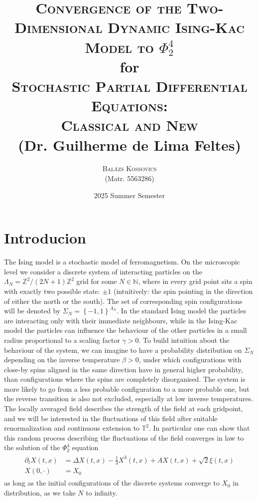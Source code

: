 \documentclass{report}
\title{\textsc{Convergence of the Two-Dimensional Dynamic Ising-Kac Model to $\Phi^4_2$}
\\[1.5em]
{\small {for}}\\[1.5em]
{\Large \textsc{Stochastic Partial Differential Equations: \\Classical and New}}\\
{\large (Dr. Guilherme de Lima Feltes)}}
\author{
    \textsc{Balázs Kossovics}\\
    {\small (Matr. 5563286)}
}
\date{2025 Summer Semester}
\newcommand{\ZZ}{\mathbb{Z}}
\newcommand{\NN}{\mathbb{N}}
\newcommand{\TT}{\mathbb{T}}
\theoremstyle{remark}
\theoremstyle{definition}
\begin{document}
\maketitle

\newpage
\setcounter{page}{2}

\tableofcontents

\chapter{Introducion}
The Ising model is a stochastic model of ferromagnetism. On the microscopic level we consider a discrete system of interacting particles on the $\Lambda_N = \ZZ^2 / (2N+1)\ZZ^2$ grid for some $N \in \NN$, where in every grid point sits a spin with exactly two possible state: $\pm1$ (intuitively: the spin pointing in the direction of either the north or the south). The set of corresponding spin configurations will be denoted by $\Sigma_N = \left\{-1, 1\right\}^{\Lambda_N}$. In the standard Ising model the particles are interacting only with their immediate neighbours, while in the Ising-Kac model the particles can influence the behaviour of the other particles in a small radius proportional to a scaling factor $\gamma > 0$. To build intuition about the behaviour of the system, we can imagine to have a probability distribution on $\Sigma_N$ depending on the inverse temperature $\beta > 0$, under which configurations with close-by spins aligned in the same direction have in general higher probability, than configurations where the spins are completely disorganised. The system is more likely to go from a less probable configuration to a more probable one, but the reverse transition is also not excluded, especially at low inverse temperatures. The locally averaged field describes the strength of the field at each gridpoint, and we will be interested in the fluctuations of this field after suitable renormalization and continuous extension to $\TT^2$. In particular one can show that this random process describing the fluctuations of the field converges in law to the solution of the $\Phi^4_2$ equation 
\begin{align}
  \label{eq:phi_4_2}
  \begin{split}
  \partial_t X(t, x) &= \Delta X(t, x) - \frac{1}{3}X^3(t, x) + A X(t, x) + \sqrt{2}\xi(t, x)\\
  X(0, \cdot) &= X_0\,    
  \end{split}
\end{align}
as long as the initial configurations of the discrete systems converge to $X_0$ in distribution, as we take $N$ to infinity.
\end{document}
